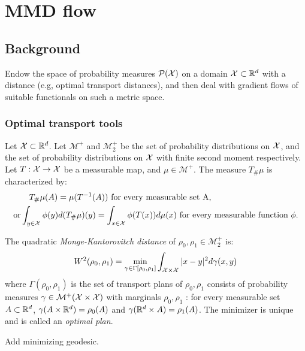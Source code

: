 \section{MMD flow}


\subsection{Background}

Endow the space of probability measures $\mathcal{P}({{\mathcal X}})$ on a domain ${{\mathcal X}} \subset {{\mathbb R}}^d$ with a distance (e.g, optimal transport distances), and then deal with gradient flows of suitable functionals on such a metric space.



\subsubsection{Optimal transport tools}

Let ${{\mathcal X}} \subset {{\mathbb R}}^d$. Let $\mathcal{M}^{+}$ and $\mathcal{M}_2^{+}$ be the set of probability distributions on ${{\mathcal X}}$, and the set of probability distributions on ${{\mathcal X}}$ with finite second moment respectively.
Let $T: {{\mathcal X}} \rightarrow {{\mathcal X}}$ be a measurable map, and $\mu \in \mathcal{M}^+$. The measure $T_{\#}\mu$
is characterized by:
\begin{align*}
	&\quad T_{\#}\mu(A) = \mu(T^{-1}(A)) \text{ for every measurable set A,}\\
\text{or}& \int_{y \in {{\mathcal X}}} \phi(y) d(T_{\#}\mu)(y) =\int_{x \in {{\mathcal X}}}\phi(T(x)) d\mu(x) \text{ for every measurable function $\phi$.}
\end{align*}


\begin{definition}\label{def:mk}
	The quadratic \textit{Monge-Kantorovitch distance} of $\rho_0, \rho_1 \in \mathcal{M}_2^{+}$ is:
	\begin{equation}
		W^2(\rho_0, \rho_1)= \min_{\gamma \in \Gamma[\rho_0, \rho_1]} \int_{{{\mathcal X}} \times {{\mathcal X}}} |x-y|^2 d\gamma(x,y)
	\end{equation}
where $\Gamma(\rho_0,\rho_1)$ is the set of transport plans of $\rho_0, \rho_1$ consists of probability measures $\gamma \in \mathcal{M}^{+}({{\mathcal X}} \times {{\mathcal X}})$ with marginals $\rho_0, \rho_1$ : for every measurable set $A \subset {{\mathbb R}}^d$, $\gamma(A \times {{\mathbb R}}^d) = \rho_0(A)$ and $\gamma({{\mathbb R}}^d \times A) = \rho_1(A)$. 
	The minimizer is unique and is called an \textit{optimal plan}. 
\end{definition}

Add minimizing geodesic.

